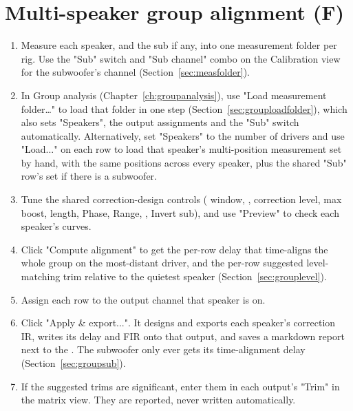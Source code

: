 \section{Multi-speaker group alignment (F)}
\begin{enumerate}[nosep]
  \item Measure each speaker, and the sub if any, into one measurement folder per rig. Use the "Sub" switch and "Sub channel" combo on the Calibration view for the subwoofer's channel (Section~\ref{sec:measfolder}).
  \item In Group analysis (Chapter~\ref{ch:groupanalysis}), use "Load measurement folder\ldots" to load that folder in one step (Section~\ref{sec:grouploadfolder}), which also sets "Speakers", the output assignments and the "Sub" switch automatically. Alternatively, set "Speakers" to the number of drivers and use "Load..." on each row to load that speaker's multi-position measurement set by hand, with the same positions across every speaker, plus the shared "Sub" row's set if there is a subwoofer.
  \item Tune the shared correction-design controls ( window, , correction level, max boost,  length, Phase, Range, , Invert sub), and use "Preview" to check each speaker's curves.
  \item Click "Compute alignment" to get the per-row delay that time-aligns the whole group on the most-distant driver, and the per-row suggested level-matching trim relative to the quietest speaker (Section~\ref{sec:grouplevel}).
  \item Assign each row to the output channel that speaker is on.
  \item Click "Apply \& export...". It designs and exports each speaker's correction IR, writes its delay and FIR onto that output, and saves a markdown report next to the . The subwoofer only ever gets its time-alignment delay (Section~\ref{sec:groupsub}).
  \item If the suggested trims are significant, enter them in each output's "Trim" in the matrix view. They are reported, never written automatically.
\end{enumerate}
